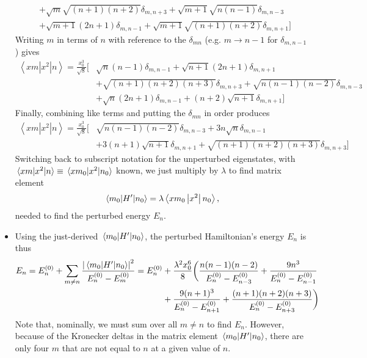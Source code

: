 \documentclass[11pt, a4paper]{article}
\newcommand{\Ham}{Hamiltonian\xspace}
\newcommand{\threebraket}[3]{\left \langle {#1} \left | {#2} \right | {#3} \right \rangle}  %
\begin{document}
\begin{itemize}
\begin{align*}
		& + \sqrt{m}\sqrt{(n+1)(n+2)}\delta_{m,n+3} + \sqrt{m+1}\sqrt{n(n-1)}\delta_{m,n-3}\\
		& + \sqrt{m+1}(2n+1)\delta_{m,n-1} + \sqrt{m+1}\sqrt{(n+1)(n+2)}\delta_{m,n+1} \Big]
	\end{align*}	
	Writing $ m $ in terms of $ n $ with reference to the $ \delta_{mn} $ (e.g. $ m \to n -1 $ for $ \delta_{m, n-1} $) gives
	\begin{align*}
			\threebraket{xm}{x^{2}}{n} = \frac{x_{0}^{3}}{\sqrt{8}} \Big[& \sqrt{n}(n-1) \delta_{m, n-1} + \sqrt{n+1}(2n+1)\delta_{m, n+1} \\
			& + \sqrt{(n+1)(n+2)(n+3)}\delta_{m, n+3}  + \sqrt{n(n-1)(n-2)}\delta_{m, n-3} \\
			& + \sqrt{n}(2n+1)\delta_{m, n-1} + (n+2)\sqrt{n+1}\delta_{m, n+1}\Big]
	\end{align*}
	Finally, combining like terms and putting the $ \delta_{mn} $ in order produces
	\begin{align*}
		\threebraket{xm}{x^{2}}{n} = \frac{x_{0}^{3}}{\sqrt{8}} \Big[&\sqrt{n(n-1)(n-2)}\delta_{m, n-3} + 3n\sqrt{n}\delta_{m, n-1}\\
		& + 3(n+1)\sqrt{n+1}\delta_{m, n+1} + \sqrt{(n+1)(n+2)(n+3)}\delta_{m, n+3}\Big]
	\end{align*}
	Switching back to subscript notation for the unperturbed eigenstates, with $ \mel{xm}{x^{2}}{n} \equiv \mel{xm_{0}}{x^{2}}{n_{0}} $ known, we just multiply by $ \lambda $ to find matrix element
	\begin{equation*}
		\mel{m_{0}}{H'}{n_{0}} = \lambda \threebraket{xm_{0}}{x^{2}}{n_{0}},
	\end{equation*}
 	needed to find the perturbed energy $ E_{n} $.
	
	\item Using the just-derived $ \mel{m_{0}}{H'}{n_{0}}  $, the perturbed \Ham's energy $ E_{n} $ is thus
	\begin{align*}
		E_{n} = E^{(0)}_{n} + \sum_{m \neq n} \frac{\abs{\mel{m_{0}}{H'}{n_{0}}}^{2}}{E^{(0)}_{n} - E^{(0)}_{m}} = E^{(0)}_{n} &+ \frac{\lambda^{2} x_{0}^{6}}{8}\bigg(\frac{n(n-1)(n-2)}{E^{(0)}_{n}-E^{(0)}_{n-3}} + \frac{9n^{3}}{E^{(0)}_{n}-E^{(0)}_{n-1}} \\
		&+ \frac{9(n+1)^{3}}{E^{(0)}_{n} - E^{(0)}_{n+1}} + \frac{(n+1)(n+2)(n+3)}{E^{(0)}_{n} - E^{(0)}_{n+3}} \bigg)
	\end{align*}
	Note that, nominally, we must sum over all $ m \neq n $ to find $ E_{n} $. However, because of the Kronecker deltas in the matrix element $ \mel{m_{0}}{H'}{n_{0}} $, there are only four $ m $ that are not equal to $ n $ at a given value of $ n $. 
	

\end{itemize}
\end{document}
